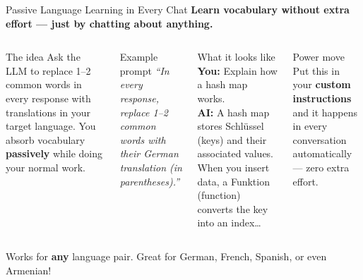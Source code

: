 \documentclass[aspectratio=169]{beamer}
\begin{document}
\begin{frame}{Passive Language Learning in Every Chat}
\small
\textbf{\color{popblue}Learn vocabulary without extra effort --- just by chatting about anything.}

\smallskip
\begin{columns}[T]
\begin{block}{The idea}
Ask the LLM to replace 1--2 common words in every response with translations in your target language. You absorb vocabulary \textbf{passively} while doing your normal work.
\end{block}

\smallskip
\begin{exampleblock}{Example prompt}
\textit{``In every response, replace 1--2 common words with their German translation (in parentheses).''}
\end{exampleblock}

\begin{block}{What it looks like}
\ttfamily\scriptsize
\textbf{You:} Explain how a hash map works.\\[4pt]
\textbf{AI:} A hash map stores Schl\"ussel (keys) and their associated values.
When you insert data, a Funktion (function) converts the key into an index\ldots
\end{block}

\smallskip
\begin{alertblock}{Power move}
Put this in your \textbf{custom instructions} and it happens in every conversation automatically --- zero extra effort.
\end{alertblock}
\end{columns}

\medskip
\begin{center}
\small\color{paramgreen}
Works for \textbf{any} language pair. Great for German, French, Spanish, or even Armenian!
\end{center}
\end{frame}
\end{document}

